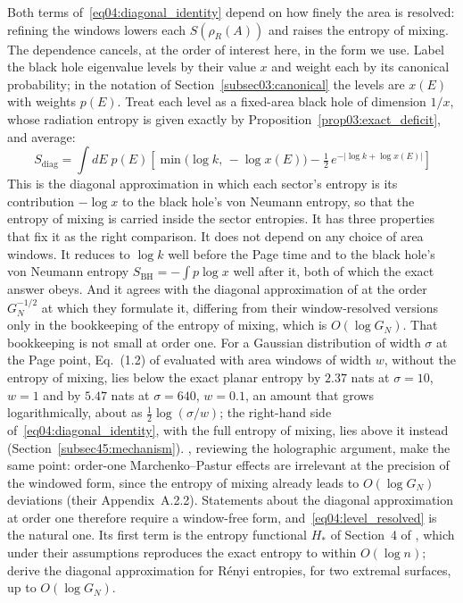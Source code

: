 \documentclass[11pt,letterpaper]{article}
\theoremstyle{plain}
\theoremstyle{definition}
\theoremstyle{remark}
\begin{document}
Both terms of~\eqref{eq04:diagonal_identity} depend on how finely the area is resolved: refining the windows lowers each $S(\rho_R(A))$ and raises the entropy of mixing. The dependence cancels, at the order of interest here, in the form we use. Label the black hole eigenvalue levels by their value $x$ and weight each by its canonical probability; in the notation of Section~\ref{subsec03:canonical} the levels are $x(E)$ with weights $p(E)$. Treat each level as a fixed-area black hole of dimension $1/x$, whose radiation entropy is given exactly by Proposition~\ref{prop03:exact_deficit}, and average:
\begin{equation}
\label{eq04:level_resolved}
\boxed{\,S_{\mathrm{diag}} = \int dE\; p(E)\left[\min\!\big(\log k,\, -\log x(E)\big) - \tfrac{1}{2}\, e^{-|\log k + \log x(E)|}\right]}
\end{equation}
This is the diagonal approximation in which each sector's entropy is its contribution $-\log x$ to the black hole's von Neumann entropy, so that the entropy of mixing is carried inside the sector entropies. It has three properties that fix it as the right comparison. It does not depend on any choice of area windows. It reduces to $\log k$ well before the Page time and to the black hole's von Neumann entropy $S_{\mathrm{BH}} = -\int p \log x$ well after it, both of which the exact answer obeys. And it agrees with the diagonal approximation of \citet{marolfwangwang2020} at the order $G_N^{-1/2}$ at which they formulate it, differing from their window-resolved versions only in the bookkeeping of the entropy of mixing, which is $O(\log G_N)$. That bookkeeping is not small at order one. For a Gaussian distribution of width $\sigma$ at the Page point, Eq.~(1.2) of \citet{marolfwangwang2020} evaluated with area windows of width $w$, without the entropy of mixing, lies below the exact planar entropy by $2.37$ nats at $\sigma = 10$, $w = 1$ and by $5.47$ nats at $\sigma = 640$, $w = 0.1$, an amount that grows logarithmically, about as $\tfrac12\log(\sigma/w)$; the right-hand side of~\eqref{eq04:diagonal_identity}, with the full entropy of mixing, lies above it instead (Section~\ref{subsec45:mechanism}). \citet{chengetal2024}, reviewing the holographic argument, make the same point: order-one Marchenko--Pastur effects are irrelevant at the precision of the windowed form, since the entropy of mixing already leads to $O(\log G_N)$ deviations (their Appendix~A.2.2). Statements about the diagonal approximation at order one therefore require a window-free form, and~\eqref{eq04:level_resolved} is the natural one. Its first term is the entropy functional $H_*$ of Section~4 of \citet{chengetal2024}, which under their assumptions reproduces the exact entropy to within $O(\log n)$; \citet{peningtonrath2025} derive the diagonal approximation for R\'enyi entropies, for two extremal surfaces, up to $O(\log G_N)$.
\end{document}
